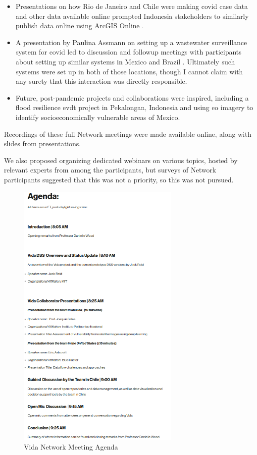 \begin{itemize}[itemsep=0pt,parsep=0pt]
	\item{Presentations on how Rio de Janeiro and Chile were making \ac{covid} case data and other data available online prompted Indonesia stakeholders to similarly publish data online using ArcGIS Online \cite{indonesiaministryofhealthDataHarianKasus2023}.}
	\item{A presentation by Paulina Assmann on setting up a wastewater surveillance system for \ac{covid} led to discussion and followup meetings with participants about setting up similar systems in Mexico and Brazil \cite{assmannBuildingWastewaterSurveillance2021}. Ultimately such systems were set up in both of those locations, though I cannot claim with any surety that this interaction was directly responsible.}
	\item{Future, post-pandemic projects and collaborations were inspired, including a flood resilience \ac{evdt} project in Pekalongan, Indonesia and using \ac{eo} imagery to identify socioeconomically vulnerable areas of Mexico.}
\end{itemize}

Recordings of these full Network meetings were made available online, along with slides from presentations.

We also proposed organizing dedicated webinars on various topics, hosted by relevant experts from among the participants, but surveys of Network participants suggested that this was not a priority, so this was not pursued. 

\begin{figure}[H]
\centering
\includegraphics[width=0.7\textwidth]{Figures/chap5/vida-network-agenda.png}
\caption{Vida Network Meeting Agenda}
\label{fig:vida-network-agenda}
\end{figure}


